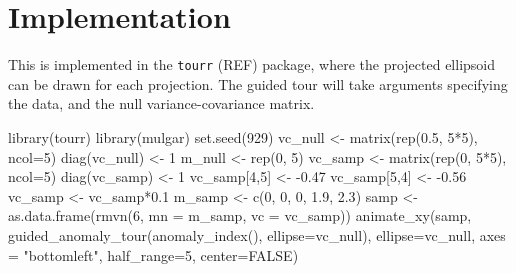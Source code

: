 \documentclass[
  12pt]{article}
\newenvironment{Shaded}{\begin{snugshade}}{\end{snugshade}}
\newcommand{\AttributeTok}[1]{\textcolor[rgb]{0.40,0.45,0.13}{#1}}
\newcommand{\ConstantTok}[1]{\textcolor[rgb]{0.56,0.35,0.01}{#1}}
\newcommand{\DecValTok}[1]{\textcolor[rgb]{0.68,0.00,0.00}{#1}}
\newcommand{\FloatTok}[1]{\textcolor[rgb]{0.68,0.00,0.00}{#1}}
\newcommand{\FunctionTok}[1]{\textcolor[rgb]{0.28,0.35,0.67}{#1}}
\newcommand{\NormalTok}[1]{\textcolor[rgb]{0.00,0.23,0.31}{#1}}
\newcommand{\OtherTok}[1]{\textcolor[rgb]{0.00,0.23,0.31}{#1}}
\newcommand{\SpecialCharTok}[1]{\textcolor[rgb]{0.37,0.37,0.37}{#1}}
\newcommand{\StringTok}[1]{\textcolor[rgb]{0.13,0.47,0.30}{#1}}
\begin{document}
\section{Implementation}\label{implementation}

This is implemented in the \texttt{tourr} (REF) package, where the
projected ellipsoid can be drawn for each projection. The guided tour
will take arguments specifying the data, and the null
variance-covariance matrix.

\begin{Shaded}
\begin{Highlighting}[]
\FunctionTok{library}\NormalTok{(tourr)}
\FunctionTok{library}\NormalTok{(mulgar)}
\FunctionTok{set.seed}\NormalTok{(}\DecValTok{929}\NormalTok{)}
\NormalTok{vc\_null }\OtherTok{\textless{}{-}} \FunctionTok{matrix}\NormalTok{(}\FunctionTok{rep}\NormalTok{(}\FloatTok{0.5}\NormalTok{, }\DecValTok{5}\SpecialCharTok{*}\DecValTok{5}\NormalTok{), }\AttributeTok{ncol=}\DecValTok{5}\NormalTok{)}
\FunctionTok{diag}\NormalTok{(vc\_null) }\OtherTok{\textless{}{-}} \DecValTok{1}
\NormalTok{m\_null }\OtherTok{\textless{}{-}} \FunctionTok{rep}\NormalTok{(}\DecValTok{0}\NormalTok{, }\DecValTok{5}\NormalTok{)}
\NormalTok{vc\_samp }\OtherTok{\textless{}{-}} \FunctionTok{matrix}\NormalTok{(}\FunctionTok{rep}\NormalTok{(}\DecValTok{0}\NormalTok{, }\DecValTok{5}\SpecialCharTok{*}\DecValTok{5}\NormalTok{), }\AttributeTok{ncol=}\DecValTok{5}\NormalTok{)}
\FunctionTok{diag}\NormalTok{(vc\_samp) }\OtherTok{\textless{}{-}} \DecValTok{1}
\NormalTok{vc\_samp[}\DecValTok{4}\NormalTok{,}\DecValTok{5}\NormalTok{] }\OtherTok{\textless{}{-}} \SpecialCharTok{{-}}\FloatTok{0.47}
\NormalTok{vc\_samp[}\DecValTok{5}\NormalTok{,}\DecValTok{4}\NormalTok{] }\OtherTok{\textless{}{-}} \SpecialCharTok{{-}}\FloatTok{0.56}
\NormalTok{vc\_samp }\OtherTok{\textless{}{-}}\NormalTok{ vc\_samp}\SpecialCharTok{*}\FloatTok{0.1}
\NormalTok{m\_samp }\OtherTok{\textless{}{-}} \FunctionTok{c}\NormalTok{(}\DecValTok{0}\NormalTok{, }\DecValTok{0}\NormalTok{, }\DecValTok{0}\NormalTok{, }\FloatTok{1.9}\NormalTok{, }\FloatTok{2.3}\NormalTok{)}
\NormalTok{samp }\OtherTok{\textless{}{-}} \FunctionTok{as.data.frame}\NormalTok{(}\FunctionTok{rmvn}\NormalTok{(}\DecValTok{6}\NormalTok{, }
                           \AttributeTok{mn =}\NormalTok{ m\_samp, }
                           \AttributeTok{vc =}\NormalTok{ vc\_samp))}
\FunctionTok{animate\_xy}\NormalTok{(samp, }\FunctionTok{guided\_anomaly\_tour}\NormalTok{(}\FunctionTok{anomaly\_index}\NormalTok{(),}
  \AttributeTok{ellipse=}\NormalTok{vc\_null), }\AttributeTok{ellipse=}\NormalTok{vc\_null, }
  \AttributeTok{axes =} \StringTok{"bottomleft"}\NormalTok{, }\AttributeTok{half\_range=}\DecValTok{5}\NormalTok{, }\AttributeTok{center=}\ConstantTok{FALSE}\NormalTok{)}
\end{Highlighting}
\end{Shaded}
\end{document}

